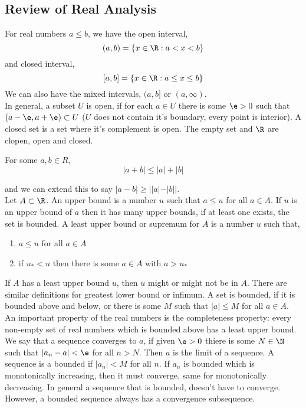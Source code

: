 \newpage
\subsection{Review of Real Analysis}
For real numbers $a \le b$, we have the open interval,
$$ (a, b) = \{x \in \R : a < x < b\} $$
and closed interval,
$$ [a, b] = \{x \in \R : a \le x \le b\} $$
We can also have the mixed intervals, $(a, b]$ or $(a, \infty)$. \\

\noindent
In general, a subset $U$ is open, if for each $a \in U$ there is some $\e > 0$ such that $(a- \e, a + \e) \subset U$ ($U$ does not contain it's boundary, every point is interior). A closed set is a set where it's complement is open. The empty set and $\R$ are clopen, open and closed.\\

\begin{nlemma}
  For some $a, b \in R$,
  $$ |a + b| \le |a| + |b| $$
\end{nlemma}
and we can extend this to say $|a - b| \ge ||a| - |b||$. \\


\noindent
Let $A \subset \R$. An upper bound is a number $u$ such that $a \le u$ for all $a \in A$. If $u$ is an upper bound of $a$ then it has many upper bounds, if at least one exists, the set is bounded. A least upper bound or supremum for $A$ is a number $u$ such that,
\begin{enumerate}
  \item $a \le u$ for all $a \in A$
  \item if $u_* < u$ then there is some $a \in A$ with $a > u_*$
\end{enumerate}
If $A$ has a least upper bound $u$, then $u$ might or might not be in $A$. There are similar definitions for greatest lower bound or infimum. A set is bounded, if it is bounded above and below, or there is some $M$ such that $|a| \le M$ for all $a \in A$. An important property of the real numbers is the completeness property: every non-empty set of real numbers which is bounded above has a least upper bound.\\

We say that a sequence converges to $a$, if given $\e > 0$ thiere is some $N \in \N$ such that $|a_n - a| < \e$ for all $n > N$. Then $a$ is the limit of a sequence. A sequence is a bounded if $|a_n| < M$ for all $n$. If $a_n$ is bounded which is monotonically increasing, then it must converge, same for monotonically decreasing. In general a sequence that is bounded, doesn't have to converge. However, a bounded sequence always has a convergence subsequence. \\

